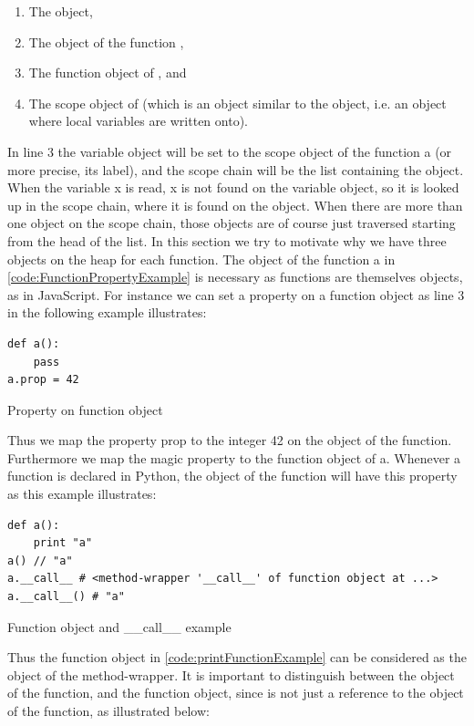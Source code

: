\begin{enumerate}
  \item The  object,
  \item The object of the function ,
  \item The function object of , and
  \item The scope object of  (which is an object similar to the  object, i.e. an object where local variables are written onto).
\end{enumerate}
In line 3 the variable object will be set to the scope object of the function a (or more precise, its label), and the scope chain will be the list containing the  object. When the variable x is read, x is not found on the variable object, so it is looked up in the scope chain, where it is found on the  object. When there are more than one object on the scope chain, those objects are of course just traversed starting from the head of the list.
In this section we try to motivate why we have three objects on the heap for each function. The object of the function a in \ref{code:FunctionPropertyExample} is necessary as functions are themselves objects, as in JavaScript. For instance we can set a property on a function object as line 3 in the following example illustrates:
\begin{listing}[H]
	\begin{verbatim}
def a():
	pass
a.prop = 42
	\end{verbatim}
\caption{Property on function object}\label{code:FunctionPropertyExample}
\end{listing}
Thus we map the property prop to the integer 42 on the object of the function. Furthermore we map the magic property  to the function object of a. Whenever a function is declared in Python, the object of the function will have this property as this example illustrates:
\begin{listing}[H]
	\begin{verbatim}
def a():
	print "a"
a() // "a"
a.__call__ # <method-wrapper '__call__' of function object at ...> 
a.__call__() # "a"
	\end{verbatim}
\caption{Function object and \_\_call\_\_ example}\label{code:printFunctionExample}
\end{listing}
Thus the function object in \ref{code:printFunctionExample} can be considered as the object of the method-wrapper. It is important to distinguish between the object of the function, and the function object, since  is not just a reference to the object of the function, as illustrated below:
